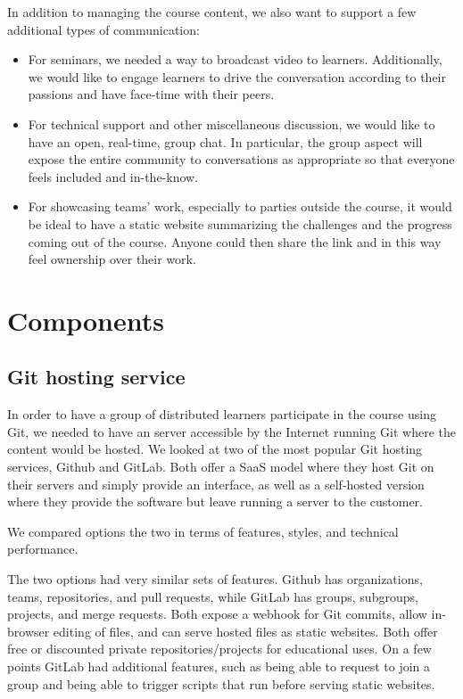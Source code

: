 \documentclass[12pt,twoside,vi]{mitthesis}
\begin{document}
In addition to managing the course content, we also want to support a few additional types of communication:
\begin{itemize}
\item For seminars, we needed a way to broadcast video to learners. Additionally, we would like to engage learners to drive the conversation according to their passions and have face-time with their peers.
\item For technical support and other miscellaneous discussion, we would like to have an open, real-time, group chat. In particular, the group aspect will expose the entire community to conversations as appropriate so that everyone feels included and in-the-know.
\item For showcasing teams' work, especially to parties outside the course, it would be ideal to have a static website summarizing the challenges and the progress coming out of the course. Anyone could then share the link and in this way feel ownership over their work.
\end{itemize}

\section{Components}

\subsection{Git hosting service}

In order to have a group of distributed learners participate in the course using Git, we needed to have an server accessible by the Internet running Git where the content would be hosted. We looked at two of the most popular Git hosting services, Github and GitLab. Both offer a SaaS model where they host Git on their servers and simply provide an interface, as well as a self-hosted version where they provide the software but leave running a server to the customer.

We compared options the two in terms of features, styles, and technical performance.

The two options had very similar sets of features. Github has organizations, teams, repositories, and pull requests, while GitLab has groups, subgroups, projects, and merge requests. Both expose a webhook for Git commits, allow in-browser editing of files, and can serve hosted files as static websites. Both offer free or discounted private repositories/projects for educational uses. On a few points GitLab had additional features, such as being able to request to join a group and being able to trigger scripts that run before serving static websites.
\end{document}
